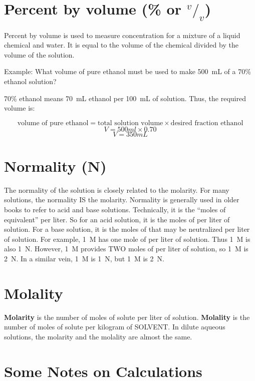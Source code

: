 \section{Percent by volume \texorpdfstring{(\% or $^v/_v$)}{}}

Percent by volume is used to measure concentration for a mixture of a liquid chemical and water. It is equal to the volume of the chemical divided by the volume of the solution.

Example: What volume of pure ethanol must be used to make 500~mL of a 70\% ethanol solution?

70\% ethanol means 70~mL ethanol per 100~mL of solution. Thus, the required volume is:

\[ \mathrm{\text{volume of pure ethanol}} = \mathrm{\text{total solution volume}} \times \mathrm{\text{desired fraction ethanol}} \]
\[ V = 500ml \times 0.70 \]
\[ V = 350 mL \] 

\section{Normality (N)} 

The normality of the solution is closely related to the molarity. For many solutions, the normality IS the molarity. Normality is generally used in older books to refer to acid and base solutions. Technically, it is the ``moles of equivalent'' per liter. So for an acid solution, it is the moles of  per liter of solution. For a base solution, it is the moles of  that may be neutralized per liter of solution. For example, 1~M  has one mole of  per liter of solution. Thus 1~M  is also 1~N. However, 1~M  provides TWO moles of  per liter of solution, so 1~M  is 2~N. In a similar vein, 1~M  is 1~N, but 1~M  is 2~N.

\section{Molality} 

\textbf{Molarity} is the number of moles of solute per liter of solution. \textbf{Molality} is the number of moles of solute per kilogram of SOLVENT. In dilute aqueous solutions, the molarity and the molality are almost the same.

\section{Some Notes on Calculations}

